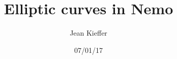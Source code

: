 \documentclass[10pt]{beamer}
\title{Elliptic curves in Nemo}
\date{07/01/17}
\author{Jean Kieffer}
\begin{document}

\begin{slide}

\maketitle

\end{slide}


\begin{slide}


\end{slide}


\begin{slide}


\end{slide}


\begin{slide}


\end{slide}


\begin{slide}


\end{slide}


\begin{slide}


\end{slide}


\begin{slide}


\end{slide}


\begin{slide}


\end{slide}


\begin{slide}


\end{slide}


\begin{slide}


\end{slide}
\end{document}
